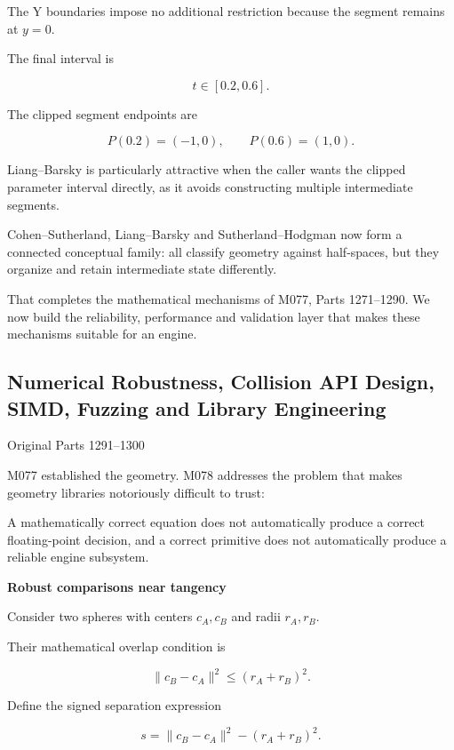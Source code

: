 The Y boundaries impose no additional restriction because the segment remains at \(y=0\).

The final interval is

\[
t\in[0.2,0.6].
\]

The clipped segment endpoints are

\[
P(0.2)=(-1,0),\qquad P(0.6)=(1,0).
\]

Liang--Barsky is particularly attractive when the caller wants the clipped parameter interval directly, as it avoids constructing multiple intermediate segments.

Cohen--Sutherland, Liang--Barsky and Sutherland--Hodgman now form a connected conceptual family: all classify geometry against half-spaces, but they organize and retain intermediate state differently.

That completes the mathematical mechanisms of M077, Parts 1271--1290. We now build the reliability, performance and validation layer that makes these mechanisms suitable for an engine.

\subsection{Numerical Robustness, Collision API Design, SIMD, Fuzzing and Library Engineering}\label{04-visual-computing-ii-ch027-numerical-robustness-collision-api-design-simd-fuzzing-and-library-engineering}

\hypertarget{04-visual-computing-ii-ch027-numerical-robustness-collision-api-design-simd-fuzzing-and-library-engineering}{}

Original Parts 1291--1300

M077 established the geometry. M078 addresses the problem that makes geometry libraries notoriously difficult to trust:

A mathematically correct equation does not automatically produce a correct floating-point decision, and a correct primitive does not automatically produce a reliable engine subsystem.

\textbf{Robust comparisons near tangency}

Consider two spheres with centers \(c_A,c_B\) and radii \(r_A,r_B\).

Their mathematical overlap condition is

\[
\|c_B-c_A\|^2\le(r_A+r_B)^2.
\]

Define the signed separation expression

\[
s=\|c_B-c_A\|^2-(r_A+r_B)^2.
\]

